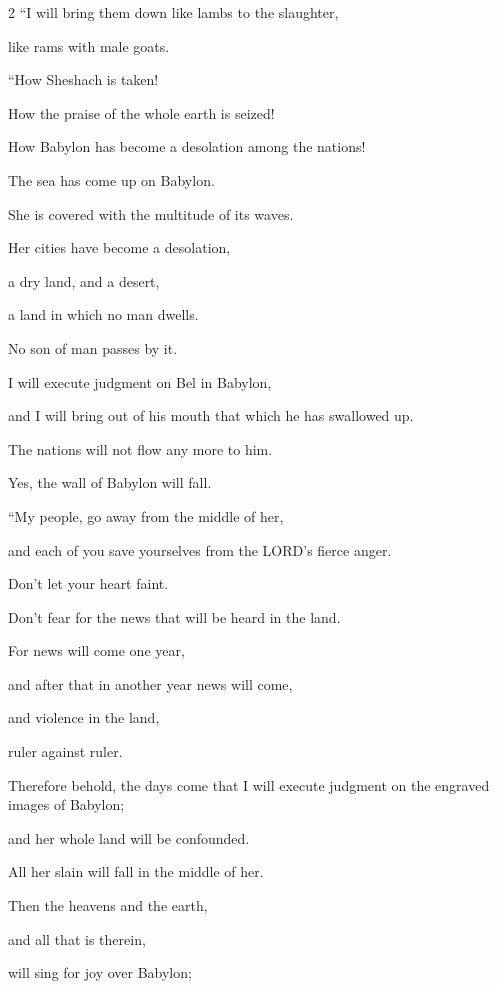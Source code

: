 \begin{multicols}{2}
\myverse{}“I will bring them down like lambs to the slaughter,

like rams with male goats.

\vspace{\baselineskip}

\myverse{}“How Sheshach is taken!

How the praise of the whole earth is seized!

How Babylon has become a desolation among the nations!


\myverse{}The sea has come up on Babylon.

She is covered with the multitude of its waves.


\myverse{}Her cities have become a desolation,

a dry land, and a desert,

a land in which no man dwells.

No son of man passes by it.


\myverse{}I will execute judgment on Bel in Babylon,

and I will bring out of his mouth that which he has swallowed up.

The nations will not flow any more to him.

Yes, the wall of Babylon will fall.

\vspace{\baselineskip}

\myverse{}“My people, go away from the middle of her,

and each of you save yourselves from the LORD’s fierce anger.


\myverse{}Don’t let your heart faint.

Don’t fear for the news that will be heard in the land.

For news will come one year,

and after that in another year news will come,

and violence in the land,

ruler against ruler.


\myverse{}Therefore behold, the days come that I will execute judgment
on the engraved images of Babylon;

and her whole land will be confounded.

All her slain will fall in the middle of her.


\myverse{}Then the heavens and the earth,

and all that is therein,

will sing for joy over Babylon;


\end{multicols}
